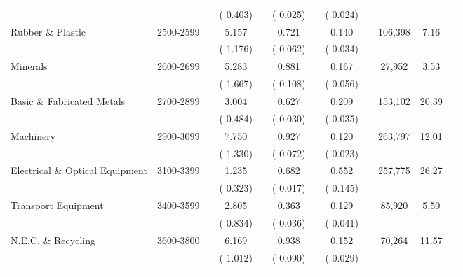 \begin{adjustwidth}{-0.25in}{-0.0in}
\begin{tabular}{lccccccccccc}
& && \footnotesize( 0.403) && \footnotesize( 0.025) && \footnotesize( 0.024) &&     &    \\ \addlinespace                                                                                                         Rubber \& Plastic  & 2500-2599 && 5.157&& 0.721&& 0.140&&  106,398&7.16\\
& && \footnotesize( 1.176) && \footnotesize( 0.062) && \footnotesize( 0.034) &&     &    \\ \addlinespace                                                                                                         Minerals  & 2600-2699 && 5.283&& 0.881&& 0.167&&   27,952&3.53\\
& && \footnotesize( 1.667) && \footnotesize( 0.108) && \footnotesize( 0.056) &&     &    \\ \addlinespace                                                                                                         Basic \& Fabricated Metals  & 2700-2899 && 3.004&& 0.627&& 0.209&&  153,102&20.39\\
& && \footnotesize( 0.484) && \footnotesize( 0.030) && \footnotesize( 0.035) &&     &    \\ \addlinespace                                                                                                         Machinery  & 2900-3099 && 7.750&& 0.927&& 0.120&&  263,797&12.01\\
& && \footnotesize( 1.330) && \footnotesize( 0.072) && \footnotesize( 0.023) &&     &    \\ \addlinespace                                                                                                         Electrical \& Optical Equipment  & 3100-3399 && 1.235&& 0.682&& 0.552&&  257,775&26.27\\
& && \footnotesize( 0.323) && \footnotesize( 0.017) && \footnotesize( 0.145) &&     &    \\ \addlinespace                                                                                                         Transport Equipment  & 3400-3599 && 2.805&& 0.363&& 0.129&&   85,920&5.50\\
& && \footnotesize( 0.834) && \footnotesize( 0.036) && \footnotesize( 0.041) &&     &    \\ \addlinespace                                                                                                         N.E.C. \& Recycling  & 3600-3800 && 6.169&& 0.938&& 0.152&&   70,264&11.57\\
& && \footnotesize( 1.012) && \footnotesize( 0.090) && \footnotesize( 0.029) &&     &    \\ \addlinespace                                                                                                         \bottomrule \\ \end{tabular} \vspace{-0.2in} \\

\end{adjustwidth}
